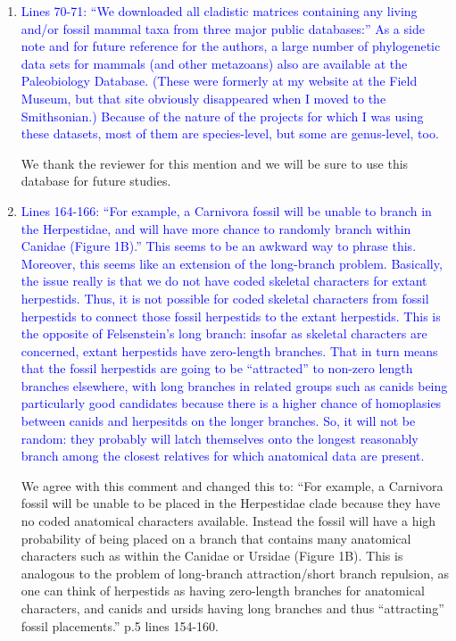 \documentclass[12pt,letterpaper]{article}
\begin{document}
\begin{enumerate}
\item{\textcolor{blue}{Lines 70-71: ``We downloaded all cladistic matrices containing any living and/or fossil mammal  taxa from three major public databases:''
As a side note and for future reference for the authors, a large number of phylogenetic data sets for mammals (and other metazoans) also are available at the Paleobiology Database.
(These were formerly at my website at the Field Museum, but that site obviously disappeared when I moved to the Smithsonian.)
Because of the nature of the projects for which I was using these datasets, most of them are species-level, but some are genus-level, too.}}

We thank the reviewer for this mention and we will be sure to use this database for future studies.

\item{\textcolor{blue}{Lines 164-166: ``For example, a Carnivora fossil will be unable to branch in the Herpestidae, and will have more chance to randomly branch within Canidae (Figure 1B).'' 
This seems to be an awkward way to phrase this.
Moreover, this seems like an extension of the long-branch problem.
Basically, the issue really is that we do not have coded skeletal characters for extant herpestids.
Thus, it is not possible for coded skeletal characters from fossil herpestids to connect those fossil herpestids to the extant herpestids.
This is the opposite of Felsenstein's long branch: insofar as skeletal characters are concerned, extant herpestids have zero-length branches.
That in turn means that the fossil herpestids are going to be ``attracted'' to non-zero length branches elsewhere, with long branches in related groups such as canids being particularly good candidates because there is a higher chance of homoplasies between canids and herpesitds on the longer branches.
So, it will not be random: they probably will latch themselves onto the longest reasonably branch among the closest relatives for which anatomical data are present.}}

We agree with this comment and changed this to:
``For example, a Carnivora fossil will be unable to be placed in the Herpestidae clade because they have no coded anatomical characters available.
Instead the fossil will have a high probability of being placed on a branch that contains many anatomical characters such as within the Canidae or Ursidae (Figure 1B). 
This is analogous to the problem of long-branch attraction/short branch repulsion, as one can think of herpestids as having zero-length branches for anatomical characters, and canids and ursids having long branches and thus ``attracting'' fossil placements.'' p.5 lines 154-160.

\end{enumerate}
\end{document}
